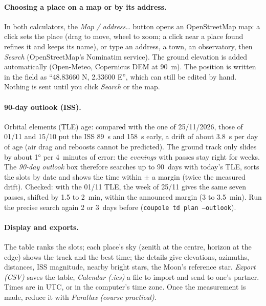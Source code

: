 \paragraph{Choosing a place on a map or by its address.} In both calculators, the \emph{Map / address…} button opens
an OpenStreetMap map: a click sets the place (drag to move, wheel to zoom; a click near a place found refines it and
keeps its name), or type an address, a town, an observatory, then \emph{Search} (OpenStreetMap's Nominatim service).
The ground elevation is added automatically (Open-Meteo, Copernicus DEM at 90~m). The position is written in the field
as “48.83660 N, 2.33600 E”, which can still be edited by hand. Nothing is sent until you click \emph{Search} or the map.

\paragraph{90-day outlook (ISS).} Orbital elements (TLE) age: compared with the one of 25/11/2026, those of 01/11 and
15/10 put the ISS 89~s and 158~s early, a drift of about 3.8~s per day of age (air drag and reboosts cannot be
predicted). The ground track only slides by about 1° per 4~minutes of error: the \emph{evenings} with passes stay
right for weeks. The \emph{90-day outlook} box therefore searches up to 90~days with today's TLE, sorts the slots by
date and shows the time within $\pm$ a margin (twice the measured drift). Checked: with the 01/11 TLE, the week of
25/11 gives the same seven passes, shifted by 1.5 to 2~min, within the announced margin (3 to 3.5~min). Run the
precise search again 2 or 3~days before (\texttt{coupole td plan --outlook}).

\paragraph{Display and exports.} The table ranks the slots; each place's sky (zenith at the centre, horizon at the
edge) shows the track and the best time; the details give elevations, azimuths, distances, ISS magnitude, nearby
bright stars, the Moon's reference star. \emph{Export (CSV)} saves the table, \emph{Calendar (.ics)} a file to import
and send to one's partner. Times are in UTC, or in the computer's time zone. Once the measurement is made, reduce it
with \emph{Parallax (course practical)}.


